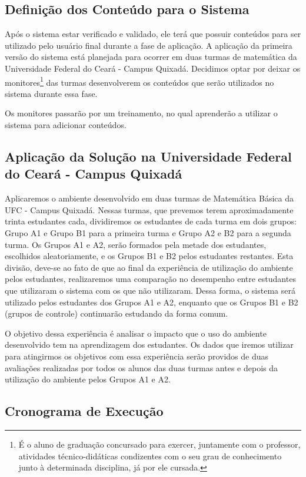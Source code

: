 \subsection{Definição dos Conteúdo para o Sistema}

Após o sistema estar verificado e validado, ele terá que possuir conteúdos para ser utilizado pelo usuário final durante a fase de aplicação. A aplicação da primeira versão do sistema está planejada 
para ocorrer em duas turmas de matemática da Universidade Federal do Ceará - Campus Quixadá. Decidimos optar por deixar os monitores\footnote{É o aluno de graduação concursado para exercer, 
juntamente 
com o professor, atividades técnico-didáticas condizentes com o seu grau de conhecimento junto à determinada disciplina, já por ele cursada.} das turmas desenvolverem os conteúdos que ser\~ao 
utilizados no sistema durante essa fase. 

Os monitores passar\~ao por um treinamento, no qual aprender\~ao a utilizar o sistema para adicionar conteúdos.

\subsection{Aplicação da Solução na Universidade Federal do Ceará - Campus Quixadá}

Aplicaremos o ambiente desenvolvido em duas turmas de Matemática Básica da UFC - Campus Quixadá. Nessas turmas, que prevemos terem aproximadamente trinta estudantes cada, dividiremos os estudantes de 
cada turma em dois grupos: Grupo A1 e Grupo B1 para a primeira turma e Grupo A2 e B2 para a segunda turma. Os Grupos A1 e A2, ser\~ao formados pela metade 
dos estudantes, escolhidos aleatoriamente, e os Grupos B1 e B2 pelos estudantes restantes. 
Esta divisão, deve-se ao fato de que ao final da experiência de utilização do ambiente pelos estudantes, realizaremos uma comparação no desempenho entre estudantes que utilizaram o sistema com os que 
não utilizaram. Dessa forma, o sistema será utilizado pelos estudantes dos Grupos A1 e A2, enquanto que os Grupos B1 e B2 (grupos de controle) continuar\~ao estudando da forma comum. 

O objetivo dessa experiência \'e analisar o impacto que o uso do ambiente desenvolvido tem na aprendizagem dos estudantes. Os dados que iremos utilizar para atingirmos os objetivos com essa 
experiência ser\~ao providos de duas avalia\c{c}\~oes realizadas por todos os alunos das duas turmas antes e depois da utiliza\c{c}\~ao do ambiente pelos Grupos A1 e A2.

\subsection{Cronograma de Execução}

